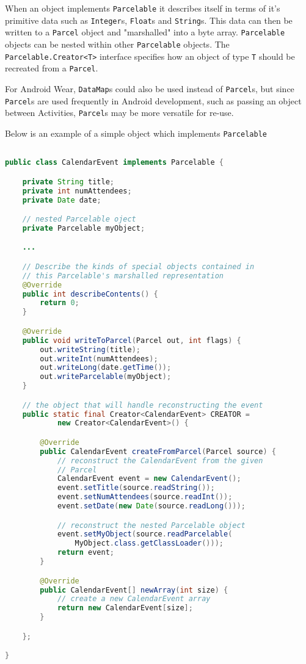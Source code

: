 When an object implements \texttt{Parcelable} it describes itself in terms of
it's primitive data such as \texttt{Integer}s, \texttt{Float}s and
\texttt{String}s. This data can then be written to a \texttt{Parcel} object and
"marshalled" into a byte array. \texttt{Parcelable} objects can be nested within
other \texttt{Parcelable} objects. The \texttt{Parcelable.Creator<T>} interface
specifies how an object of type \texttt{T} should be recreated from a
\texttt{Parcel}.

For Android Wear, \texttt{DataMap}s could also be used instead of
\texttt{Parcel}s, but since \texttt{Parcel}s are used frequently in Android
development, such as passing an object between Activities, \texttt{Parcel}s
may be more versatile for re-use.

Below is an example of a simple object which implements \texttt{Parcelable}

\begin{lstlisting}[language=Java]

public class CalendarEvent implements Parcelable {

    private String title;
    private int numAttendees;
    private Date date;

    // nested Parcelable oject
    private Parcelable myObject;

    ...

    // Describe the kinds of special objects contained in
    // this Parcelable's marshalled representation
    @Override
    public int describeContents() {
        return 0;
    }

    @Override
    public void writeToParcel(Parcel out, int flags) {
        out.writeString(title);
        out.writeInt(numAttendees);
        out.writeLong(date.getTime());
        out.writeParcelable(myObject);
    }

    // the object that will handle reconstructing the event
    public static final Creator<CalendarEvent> CREATOR =
            new Creator<CalendarEvent>() {

        @Override
        public CalendarEvent createFromParcel(Parcel source) {
            // reconstruct the CalendarEvent from the given
            // Parcel
            CalendarEvent event = new CalendarEvent();
            event.setTitle(source.readString());
            event.setNumAttendees(source.readInt());
            event.setDate(new Date(source.readLong()));

            // reconstruct the nested Parcelable object
            event.setMyObject(source.readParcelable(
                MyObject.class.getClassLoader()));
            return event;
        }

        @Override
        public CalendarEvent[] newArray(int size) {
            // create a new CalendarEvent array
            return new CalendarEvent[size];
        }

    };

}

\end{lstlisting}

